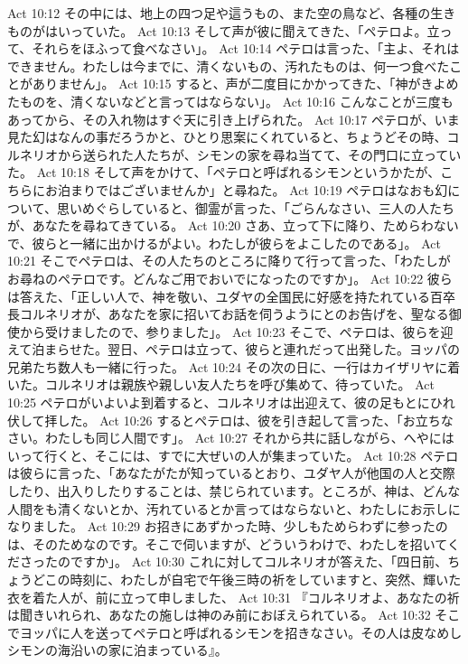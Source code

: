 Act 10:12  その中には、地上の四つ足や這うもの、また空の鳥など、各種の生きものがはいっていた。
Act 10:13  そして声が彼に聞えてきた、「ペテロよ。立って、それらをほふって食べなさい」。
Act 10:14  ペテロは言った、「主よ、それはできません。わたしは今までに、清くないもの、汚れたものは、何一つ食べたことがありません」。
Act 10:15  すると、声が二度目にかかってきた、「神がきよめたものを、清くないなどと言ってはならない」。
Act 10:16  こんなことが三度もあってから、その入れ物はすぐ天に引き上げられた。
Act 10:17  ペテロが、いま見た幻はなんの事だろうかと、ひとり思案にくれていると、ちょうどその時、コルネリオから送られた人たちが、シモンの家を尋ね当てて、その門口に立っていた。
Act 10:18  そして声をかけて、「ペテロと呼ばれるシモンというかたが、こちらにお泊まりではございませんか」と尋ねた。
Act 10:19  ペテロはなおも幻について、思いめぐらしていると、御霊が言った、「ごらんなさい、三人の人たちが、あなたを尋ねてきている。
Act 10:20  さあ、立って下に降り、ためらわないで、彼らと一緒に出かけるがよい。わたしが彼らをよこしたのである」。
Act 10:21  そこでペテロは、その人たちのところに降りて行って言った、「わたしがお尋ねのペテロです。どんなご用でおいでになったのですか」。
Act 10:22  彼らは答えた、「正しい人で、神を敬い、ユダヤの全国民に好感を持たれている百卒長コルネリオが、あなたを家に招いてお話を伺うようにとのお告げを、聖なる御使から受けましたので、参りました」。
Act 10:23  そこで、ペテロは、彼らを迎えて泊まらせた。翌日、ペテロは立って、彼らと連れだって出発した。ヨッパの兄弟たち数人も一緒に行った。
Act 10:24  その次の日に、一行はカイザリヤに着いた。コルネリオは親族や親しい友人たちを呼び集めて、待っていた。
Act 10:25  ペテロがいよいよ到着すると、コルネリオは出迎えて、彼の足もとにひれ伏して拝した。
Act 10:26  するとペテロは、彼を引き起して言った、「お立ちなさい。わたしも同じ人間です」。
Act 10:27  それから共に話しながら、へやにはいって行くと、そこには、すでに大ぜいの人が集まっていた。
Act 10:28  ペテロは彼らに言った、「あなたがたが知っているとおり、ユダヤ人が他国の人と交際したり、出入りしたりすることは、禁じられています。ところが、神は、どんな人間をも清くないとか、汚れているとか言ってはならないと、わたしにお示しになりました。
Act 10:29  お招きにあずかった時、少しもためらわずに参ったのは、そのためなのです。そこで伺いますが、どういうわけで、わたしを招いてくださったのですか」。
Act 10:30  これに対してコルネリオが答えた、「四日前、ちょうどこの時刻に、わたしが自宅で午後三時の祈をしていますと、突然、輝いた衣を着た人が、前に立って申しました、
Act 10:31  『コルネリオよ、あなたの祈は聞きいれられ、あなたの施しは神のみ前におぼえられている。
Act 10:32  そこでヨッパに人を送ってペテロと呼ばれるシモンを招きなさい。その人は皮なめしシモンの海沿いの家に泊まっている』。
